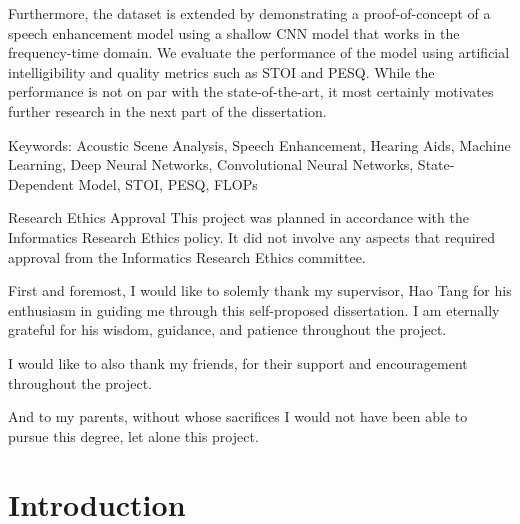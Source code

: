 \documentclass[logo,bsc,singlespacing,parskip,online]{infthesis}
\begin{document}
\begin{preliminary}
{   Furthermore, the dataset is extended by demonstrating a proof-of-concept of a speech enhancement model 
   using a shallow CNN model that works in the frequency-time domain. We evaluate the performance of the model 
   using artificial intelligibility and quality metrics such as STOI and PESQ. While the performance is not on par 
   with the state-of-the-art, it most certainly motivates further research in the next part of the dissertation.

   Keywords: Acoustic Scene Analysis, Speech Enhancement, Hearing Aids, Machine Learning, Deep Neural Networks, Convolutional Neural Networks, 
   State-Dependent Model, STOI, PESQ, FLOPs
}

\maketitle

\newenvironment{ethics}
   {\begin{frontenv}{Research Ethics Approval}{\LARGE}}
   {\end{frontenv}\newpage}

\begin{ethics}
This project was planned in accordance with the Informatics Research
Ethics policy. It did not involve any aspects that required approval
from the Informatics Research Ethics committee.

\standarddeclaration
\end{ethics}


\begin{acknowledgements}
First and foremost, I would like to solemly thank my supervisor, Hao Tang for 
his enthusiasm in guiding me through this self-proposed dissertation. I am eternally grateful for his wisdom, guidance, and patience throughout the project.

I would like to also thank my friends, for their support and encouragement throughout the project. 

And to my parents, without whose sacrifices I would not have been able to pursue this degree, let alone this project.
\end{acknowledgements}


\tableofcontents
\end{preliminary}


\chapter{Introduction}
\end{document}
